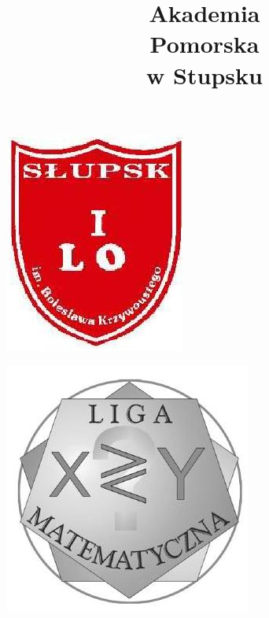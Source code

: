 \documentclass[10pt]{article}
\title{Akademia \\
 Pomorska \\
 w Stupsku }
\author{}
\date{}
\begin{document}
\maketitle
\begin{center}
\includegraphics[max width=\textwidth]{2024_11_21_1bed3b49e20da7fb8c35g-1}
\end{center}

\begin{center}
\includegraphics[max width=\textwidth]{2024_11_21_1bed3b49e20da7fb8c35g-1(1)}
\end{center}
\end{document}
